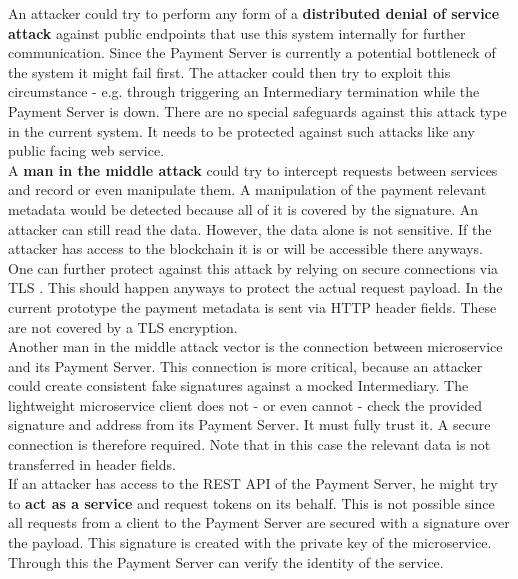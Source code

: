 \documentclass[a4paper,12pt]{scrartcl}
\begin{document}
An attacker could try to perform any form of a \textbf{distributed denial of service attack} \cite{lau2000distributed} against public endpoints that use this system internally for further communication. Since the Payment Server is currently a potential bottleneck of the system it might fail first. The attacker could then try to exploit this circumstance - e.g. through triggering an Intermediary termination while the Payment Server is down. There are no special safeguards against this attack type in the current system. It needs to be protected against such attacks like any public facing web service.\\

A \textbf{man in the middle attack} \cite{desmedt2011man} could try to intercept requests between services and record or even manipulate them. A manipulation of the payment relevant metadata would be detected because all of it is covered by the signature. An attacker can still read the data. However, the data alone is not sensitive. If the attacker has access to the blockchain it is or will be accessible there anyways. One can further protect against this attack by relying on secure connections via TLS \cite{dierks1999rfc}. This should happen anyways to protect the actual request payload. In the current prototype the payment metadata is sent via HTTP header fields. These are not covered by a TLS encryption.\\
Another man in the middle attack vector is the connection between microservice and its Payment Server. This connection is more critical, because an attacker could create consistent fake signatures against a mocked Intermediary. The lightweight microservice client does not - or even cannot - check the provided signature and address from its Payment Server. It must fully trust it. A secure connection is therefore required. Note that in this case the relevant data is not transferred in header fields.\\

If an attacker has access to the REST API of the Payment Server, he might try to \textbf{act as a service} and request tokens on its behalf. This is not possible since all requests from a client to the Payment Server are secured with a signature over the payload. This signature is created with the private key of the microservice. Through this the Payment Server can verify the identity of the service.\\
\end{document}
